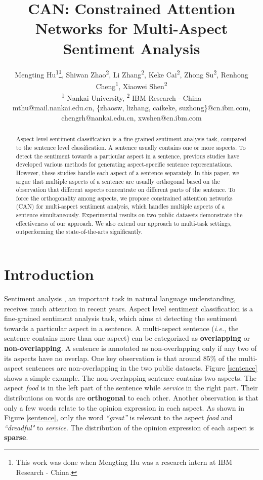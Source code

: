\documentclass[11pt,a4paper]{article}
\title{CAN: Constrained Attention Networks for Multi-Aspect Sentiment Analysis}
\author{Mengting Hu\textsuperscript{1}\thanks{\quad This work was done when Mengting Hu was a research intern at IBM Research - China.}, Shiwan Zhao\textsuperscript{2}, Li Zhang\textsuperscript{2}, Keke Cai\textsuperscript{2},
Zhong Su\textsuperscript{2}, Renhong Cheng\textsuperscript{1}, Xiaowei Shen\textsuperscript{2} \\
\textsuperscript{1} Nankai University, \textsuperscript{2} IBM Research - China \\
mthu@mail.nankai.edu.cn, \{zhaosw, lizhang, caikeke, suzhong\}@cn.ibm.com, \\ chengrh@nankai.edu.cn, xwshen@cn.ibm.com
}
\begin{document}
\maketitle
\begin{abstract}
Aspect level sentiment classification is a fine-grained sentiment analysis task, compared to the sentence level classification. A sentence usually contains one or more aspects. To detect the sentiment towards a particular aspect in a sentence, previous studies have developed various methods for generating aspect-specific sentence representations. However, these studies handle each aspect of a sentence separately. In this paper, we argue that multiple aspects of a sentence are usually orthogonal based on the observation that different aspects concentrate on different parts of the sentence. To force the orthogonality among aspects, we propose constrained attention networks (CAN) for multi-aspect sentiment analysis, which handles multiple aspects of a sentence simultaneously. Experimental results on two public datasets demonstrate the effectiveness of our approach. We also extend our approach to multi-task settings, outperforming the state-of-the-arts significantly.
\end{abstract}
\section{Introduction}
Sentiment analysis \cite{Nasukawa2003Sentiment,liu2012sentiment}, an important task in natural language understanding, receives much attention in recent years. Aspect level sentiment classification is a fine-grained sentiment analysis task, which aims at detecting the sentiment towards a particular aspect in a sentence. A multi-aspect sentence (\emph{i.e.}, the sentence contains more than one aspect) can be categorized as {\bf overlapping} or {\bf non-overlapping}. A sentence is annotated as non-overlapping only if any two of its aspects have no overlap. One key observation is that around $85\%$ of the multi-aspect sentences are non-overlapping in the two public datasets. Figure \ref{sentence} shows a simple example. The non-overlapping sentence contains two aspects. The aspect \emph{food} is in the left part of the sentence while \emph{service} in the right part. Their distributions on words are {\bf orthogonal} to each other. Another observation is that only a few words relate to the opinion expression in each aspect. As shown in Figure \ref{sentence}, only the word \emph{``great''} is relevant to the aspect \emph{food} and \emph{``dreadful"} to \emph{service}. The distribution of the opinion expression of each aspect is {\bf sparse}. 
\end{document}
